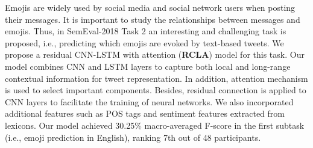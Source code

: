 Emojis are widely used by social media and social network users when posting their messages. It is important to study the relationships between messages and emojis. Thus, in SemEval-2018 Task 2 an interesting and challenging task is proposed, i.e., predicting which emojis are evoked by text-based tweets. We propose a residual CNN-LSTM with attention (\textbf{RCLA}) model for this task. Our model combines CNN and LSTM layers to capture both local and long-range contextual information for tweet representation. In addition, attention mechanism is used to select important components. Besides, residual connection is applied to CNN layers to facilitate the training of neural networks. We also incorporated additional features such as POS tags and sentiment features extracted from lexicons. Our model achieved 30.25\% macro-averaged F-score in the first subtask (i.e., emoji prediction in English), ranking 7th out of 48 participants.
